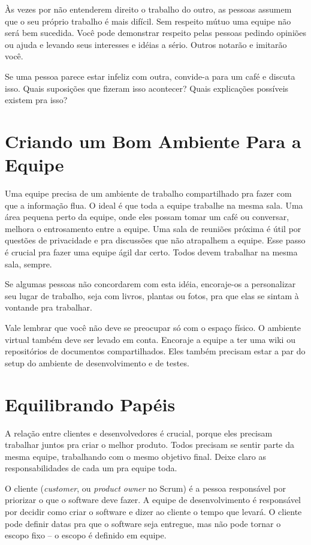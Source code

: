 \documentclass[a4paper, 10pt, font=plain]{abnt}
\begin{document}
Às vezes por não entenderem direito o trabalho do outro, as pessoas assumem que o seu próprio trabalho é mais difícil. Sem respeito mútuo uma equipe não será bem sucedida. Você pode demonstrar respeito pelas pessoas pedindo opiniões ou ajuda e levando seus interesses e idéias a sério. Outros notarão e imitarão você.

Se uma pessoa parece estar infeliz com outra, convide-a para um café e discuta isso. Quais suposições que fizeram isso acontecer? Quais explicações possíveis existem pra isso?


\section{Criando um Bom Ambiente Para a Equipe}
Uma equipe precisa de um ambiente de trabalho compartilhado pra fazer com que a informação flua. O ideal é que toda a equipe trabalhe na mesma sala. Uma área pequena perto da equipe, onde eles possam tomar um café ou conversar, melhora o entrosamento entre a equipe. Uma sala de reuniões próxima é útil por questões de privacidade e pra discussões que não atrapalhem a equipe. Esse passo é crucial pra fazer uma equipe ágil dar certo. Todos devem trabalhar na mesma sala, sempre.

Se algumas pessoas não concordarem com esta idéia, encoraje-os a personalizar seu lugar de trabalho, seja com livros, plantas ou fotos, pra que elas se sintam à vontande pra trabalhar.

Vale lembrar que você não deve se preocupar só com o espaço físico. O ambiente virtual também deve ser levado em conta. Encoraje a equipe a ter uma wiki ou repositórios de documentos compartilhados. Eles também precisam estar a par do setup do ambiente de desenvolvimento e de testes.


\section{Equilibrando Papéis}
A relação entre clientes e desenvolvedores é crucial, porque eles precisam trabalhar juntos pra criar o melhor produto. Todos precisam se sentir parte da mesma equipe, trabalhando com o mesmo objetivo final. Deixe claro as responsabilidades de cada um pra equipe toda.

O cliente (\textit{customer}, ou \textit{product owner} no Scrum) é a pessoa responsável por priorizar o que o software deve fazer. A equipe de desenvolvimento é responsável por decidir como criar o software e dizer ao cliente o tempo que levará. O cliente pode definir datas pra que o software seja entregue, mas não pode tornar o escopo fixo -- o escopo é definido em equipe.
\end{document}
